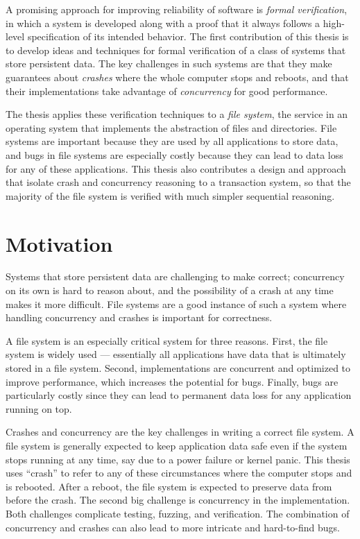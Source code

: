 A promising approach for improving reliability of software is \emph{formal verification}, in which
a system is developed along with a proof that it always follows a high-level
specification of its intended behavior. The first contribution of this
thesis is to develop ideas and techniques for formal verification of a class of
systems that store persistent data. The key challenges in such systems are that
they make guarantees about \emph{crashes} where the whole computer stops and
reboots, and that their implementations take advantage of \emph{concurrency} for
good performance.

The thesis applies these verification techniques to a \emph{file system},
the service in an operating system that implements the abstraction of files and
directories. File systems are important because they are used by all
applications to store data, and bugs in file systems are especially costly
because they can lead to data loss for any of these applications. This thesis
also contributes a design and approach that isolate crash and concurrency
reasoning to a transaction system, so that the majority of the file system is
verified with much simpler sequential reasoning.

\section{Motivation}
\label{sec:intro:motivation}

Systems that store persistent data are challenging to make correct; concurrency
on its own is hard to reason about, and the possibility of a crash at any time
makes it more difficult. File systems are a good instance of such a system where
handling concurrency and crashes is important for correctness.

A file system is an especially critical system for
three reasons. First, the file system is widely used --- essentially all applications have
data that is ultimately stored in a file system. Second, implementations are
concurrent and optimized to improve performance, which increases the potential
for bugs. Finally, bugs are particularly costly since they can lead to permanent
data loss for any application running on top.

Crashes and
concurrency are the key challenges in writing a correct file system.
A file system is generally expected to keep application data safe
even if the system stops running at any time, say due to a power failure or
kernel panic. This thesis uses ``crash'' to refer to any of these circumstances
where the computer stops and is rebooted. After a reboot, the file system is
expected to preserve data from before the crash. The second big challenge is
concurrency in the implementation. Both challenges complicate testing, fuzzing,
and verification. The combination of concurrency and crashes can also lead to more
intricate and hard-to-find bugs.

